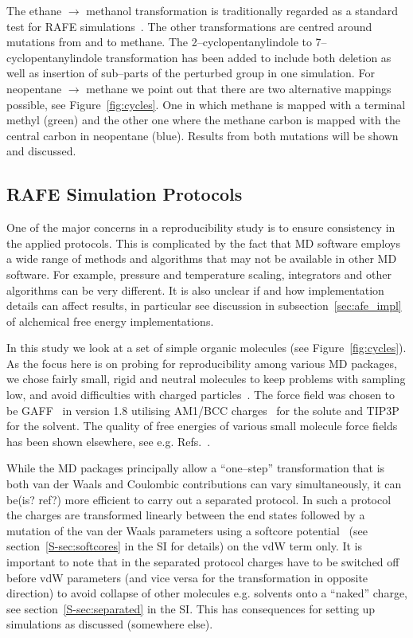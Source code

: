 \documentclass[journal=jctcce,manuscript=article]{achemso}
\begin{document}
The ethane $\rightarrow$ methanol transformation is traditionally
regarded as a standard test for RAFE
simulations~\cite{doi:10.1063/1.449208, doi:10.1021/jp981629f}.  The
other transformations are centred around mutations from and to
methane.  The 2--cyclopentanylindole to 7--cyclopentanylindole
transformation has been added to include both deletion as well as
insertion of sub--parts of the perturbed group in one simulation.  For
neopentane $\rightarrow$ methane we point out that there are two
alternative mappings possible, see Figure~\ref{fig:cycles}.  One in
which methane is mapped with a terminal methyl (green) and the other
one where the methane carbon is mapped with the central carbon in
neopentane (blue).  Results from both mutations will be shown and
discussed.


\subsection{RAFE Simulation Protocols}
\label{sec:rafe_protocols}

One of the major concerns in a reproducibility study is to ensure
consistency in the applied protocols.  This is complicated by the fact
that MD software employs a wide range of methods and algorithms that
may not be available in other MD software.  For example, pressure and
temperature scaling, integrators and other algorithms can be very
different.  It is also unclear if and how implementation details can
affect results, in particular see discussion in
subsection~\ref{sec:afe_impl} of alchemical free energy
implementations.

In this study we look at a set of simple organic molecules (see
Figure~\ref{fig:cycles}).  As the focus here is on probing for
reproducibility among various MD packages, we chose fairly small,
rigid and neutral molecules to keep problems with sampling low, and
avoid difficulties with charged
particles~\cite{rocklin_calculating_2013, JCC:JCC1050}.  The force
field was chosen to be GAFF~\cite{wang_development_2004} in version
1.8 utilising AM1/BCC charges~\cite{jakalian_fast_2000,
  jakalian_fast_2002} for the solute and
TIP3P~\cite{jorgensen_comparison_1983-1} for the solvent.  The quality
of free energies of various small molecule force fields has been shown
elsewhere, see e.g. Refs.~.

While the MD packages principally allow a ``one--step'' transformation
that is both van der Waals and Coulombic contributions can vary
simultaneously, it can be(is? ref?) more efficient to carry out a
separated protocol.  In such a protocol the charges are transformed
linearly between the end states followed by a mutation of the van der
Waals parameters using a softcore
potential~\cite{beutler_avoiding_1994,
  zacharias_separationshifted_1994} (see section~\ref{S-sec:softcores} in the SI for details) on the vdW
term only.  It is important to note that in the separated protocol
charges have to be switched off before vdW parameters (and vice versa
for the transformation in opposite direction) to avoid collapse of
other molecules e.g. solvents onto a ``naked'' charge, see section~\ref{S-sec:separated} in the SI.  This
has consequences for setting up simulations as discussed (somewhere
else).
\end{document}
